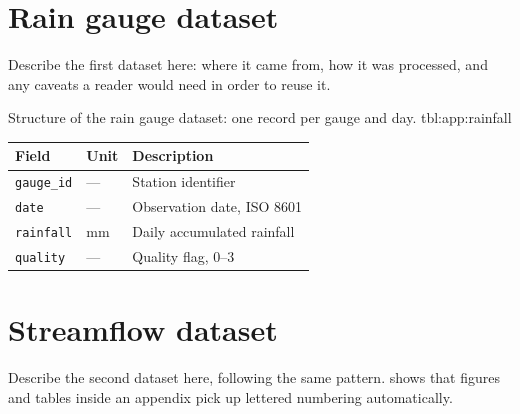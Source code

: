 

\section{Rain gauge dataset} \label{app:rainfall}

Describe the first dataset here: where it came from, how it was
processed, and any caveats a reader would need in order to reuse
it.

\lipsum[21]

\begin{TableM}[ht]{%
  Structure of the rain gauge dataset: one record per gauge and
  day.%
}{tbl:app:rainfall}
\scriptsize
\sffamily
\begin{tabularx}{\linewidth}{LLL}
\toprule
\textbf{Field} & \textbf{Unit} & \textbf{Description} \\
\midrule
\texttt{gauge\_id} & ---    & Station identifier \\
\texttt{date}      & ---    & Observation date, ISO 8601 \\
\texttt{rainfall}  & mm     & Daily accumulated rainfall \\
\texttt{quality}   & ---    & Quality flag, 0--3 \\
\bottomrule
\end{tabularx}
\end{TableM}

\lipsum[22]

\section{Streamflow dataset} \label{app:streamflow}

Describe the second dataset here, following the same pattern.
 shows that figures and tables inside an
appendix pick up lettered numbering automatically.

\lipsum[23]


\lipsum[24]
